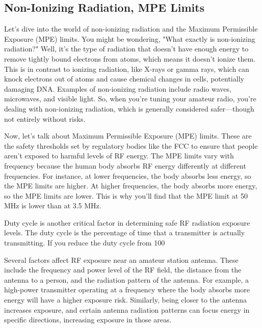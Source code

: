 \subsection{Non-Ionizing Radiation, MPE Limits}
\label{subsec:non-ionizing}

Let's dive into the world of non-ionizing radiation and the Maximum Permissible Exposure (MPE) limits. You might be wondering, "What exactly is non-ionizing radiation?" Well, it's the type of radiation that doesn't have enough energy to remove tightly bound electrons from atoms, which means it doesn't ionize them. This is in contrast to ionizing radiation, like X-rays or gamma rays, which can knock electrons out of atoms and cause chemical changes in cells, potentially damaging DNA. Examples of non-ionizing radiation include radio waves, microwaves, and visible light. So, when you're tuning your amateur radio, you're dealing with non-ionizing radiation, which is generally considered safer—though not entirely without risks.

Now, let's talk about Maximum Permissible Exposure (MPE) limits. These are the safety thresholds set by regulatory bodies like the FCC to ensure that people aren't exposed to harmful levels of RF energy. The MPE limits vary with frequency because the human body absorbs RF energy differently at different frequencies. For instance, at lower frequencies, the body absorbs less energy, so the MPE limits are higher. At higher frequencies, the body absorbs more energy, so the MPE limits are lower. This is why you'll find that the MPE limit at 50 MHz is lower than at 3.5 MHz.

Duty cycle is another critical factor in determining safe RF radiation exposure levels. The duty cycle is the percentage of time that a transmitter is actually transmitting. If you reduce the duty cycle from 100%

Several factors affect RF exposure near an amateur station antenna. These include the frequency and power level of the RF field, the distance from the antenna to a person, and the radiation pattern of the antenna. For example, a high-power transmitter operating at a frequency where the body absorbs more energy will have a higher exposure risk. Similarly, being closer to the antenna increases exposure, and certain antenna radiation patterns can focus energy in specific directions, increasing exposure in those areas.

